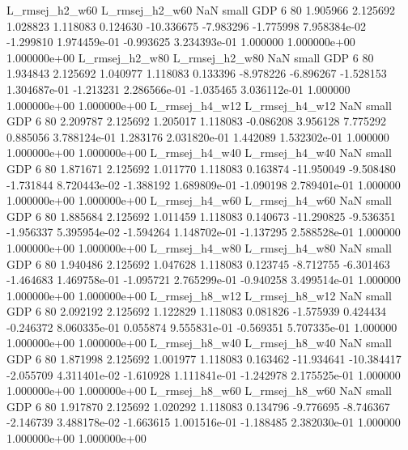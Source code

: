 L_rmsej_h2_w60 L_rmsej_h2_w60                   NaN      small      GDP                 6 80 1.905966       2.125692 1.028823       1.118083    0.124630    -10.336675     -7.983296    -1.775998   7.958384e-02 -1.299810 1.974459e-01    -0.993625   3.234393e-01            1.000000    1.000000e+00        1.000000e+00
L_rmsej_h2_w80 L_rmsej_h2_w80                   NaN      small      GDP                 6 80 1.934843       2.125692 1.040977       1.118083    0.133396     -8.978226     -6.896267    -1.528153   1.304687e-01 -1.213231 2.286566e-01    -1.035465   3.036112e-01            1.000000    1.000000e+00        1.000000e+00
L_rmsej_h4_w12 L_rmsej_h4_w12                   NaN      small      GDP                 6 80 2.209787       2.125692 1.205017       1.118083   -0.086208      3.956128      7.775292     0.885056   3.788124e-01  1.283176 2.031820e-01     1.442089   1.532302e-01            1.000000    1.000000e+00        1.000000e+00
L_rmsej_h4_w40 L_rmsej_h4_w40                   NaN      small      GDP                 6 80 1.871671       2.125692 1.011770       1.118083    0.163874    -11.950049     -9.508480    -1.731844   8.720443e-02 -1.388192 1.689809e-01    -1.090198   2.789401e-01            1.000000    1.000000e+00        1.000000e+00
L_rmsej_h4_w60 L_rmsej_h4_w60                   NaN      small      GDP                 6 80 1.885684       2.125692 1.011459       1.118083    0.140673    -11.290825     -9.536351    -1.956337   5.395954e-02 -1.594264 1.148702e-01    -1.137295   2.588528e-01            1.000000    1.000000e+00        1.000000e+00
L_rmsej_h4_w80 L_rmsej_h4_w80                   NaN      small      GDP                 6 80 1.940486       2.125692 1.047628       1.118083    0.123745     -8.712755     -6.301463    -1.464683   1.469758e-01 -1.095721 2.765299e-01    -0.940258   3.499514e-01            1.000000    1.000000e+00        1.000000e+00
L_rmsej_h8_w12 L_rmsej_h8_w12                   NaN      small      GDP                 6 80 2.092192       2.125692 1.122829       1.118083    0.081826     -1.575939      0.424434    -0.246372   8.060335e-01  0.055874 9.555831e-01    -0.569351   5.707335e-01            1.000000    1.000000e+00        1.000000e+00
L_rmsej_h8_w40 L_rmsej_h8_w40                   NaN      small      GDP                 6 80 1.871998       2.125692 1.001977       1.118083    0.163462    -11.934641    -10.384417    -2.055709   4.311401e-02 -1.610928 1.111841e-01    -1.242978   2.175525e-01            1.000000    1.000000e+00        1.000000e+00
L_rmsej_h8_w60 L_rmsej_h8_w60                   NaN      small      GDP                 6 80 1.917870       2.125692 1.020292       1.118083    0.134796     -9.776695     -8.746367    -2.146739   3.488178e-02 -1.663615 1.001516e-01    -1.188485   2.382030e-01            1.000000    1.000000e+00        1.000000e+00
